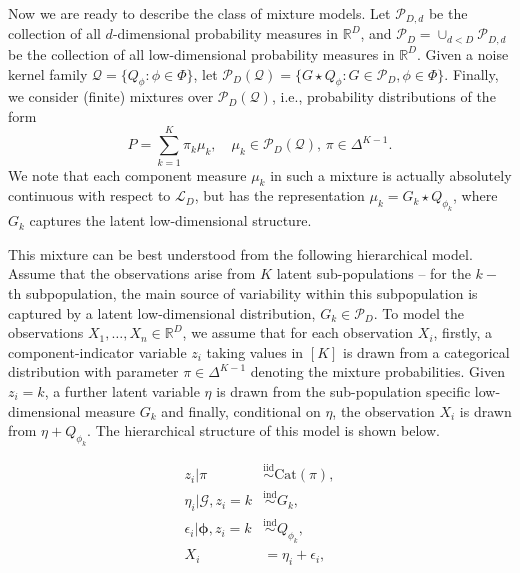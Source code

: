 \documentclass[bj,authoryear]{imsart}
\theoremstyle{plain}
\theoremstyle{remark}
\def\bphi{{\boldsymbol\phi}}
\def\bbR{\mathbb{R}}
\def\cG{\mathcal{G}}
\def\cL{\mathcal{L}}
\def\cP{\mathcal{P}}
\def\cQ{\mathcal{Q}}
\begin{document}
Now we are ready to describe the class of mixture models. Let $\cP_{D,d}$ be the collection of all $d$-dimensional probability measures in $\bbR^D$, and $\cP_D= \cup_{d<D} \cP_{D,d}$ be the collection of all low-dimensional probability measures in $\bbR^D$. Given a noise kernel family $\cQ=\{Q_{\phi}:\phi\in \Phi\}$, let $\cP_D(\cQ)=\{G\star Q_{\phi} : G\in \cP_D, \phi\in \Phi\}$. Finally, we consider (finite) mixtures over $\cP_D(\cQ)$, i.e., probability distributions of the form
$$P = \sum_{k=1}^K \pi_k \mu_k, \quad \mu_k\in \cP_D(\cQ), \, \pi\in\Delta^{K-1}.$$
We note that each component measure $\mu_k$ in such a mixture is actually absolutely continuous with respect to $\cL_D$, but has the representation $\mu_k=G_k\star Q_{\phi_k}$, where $G_k$ captures the latent low-dimensional structure. 

This mixture can be best understood from the following hierarchical model. Assume that the observations arise from $K$ latent sub-populations -- for the $k-$th subpopulation, the main source of variability within this subpopulation is captured by a latent low-dimensional distribution, $G_k\in \cP_D$. To model the observations $X_1,\dots,X_n\in \bbR^D$, we assume that for each observation $X_i$, firstly, a component-indicator variable $z_i$ taking values in $[K]$ is drawn from a categorical distribution with parameter $\pi\in\Delta^{K-1}$ denoting the mixture probabilities. Given $z_i=k$, a further latent variable $\eta$ is drawn from the sub-population specific low-dimensional measure $G_k$ and finally, conditional on $\eta$, the observation $X_i$ is drawn from $\eta + Q_{\phi_k}$. The hierarchical structure of this model is shown below.

\begin{equation}
\begin{aligned}\label{model}
    z_i | \pi &\overset{\text{iid}}{\sim} \text{Cat}(\pi),\\
    \eta_i | \cG, z_i=k &\overset{\text{ind}}{\sim} G_k, \\
    \epsilon_i |\bphi, z_i=k &\overset{\text{ind}}{\sim} Q_{\phi_k}, \\
    X_i &= \eta_i + \epsilon_i,
    \end{aligned}
\end{equation}
\end{document}
